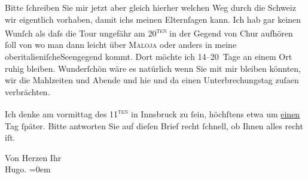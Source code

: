 \pstart
           Bitte{ }ſchreiben Sie mir jetzt {\pb}aber gleich hierher welchen Weg durch die Schweiz wir eigentlich vorhaben, damit ichs meinen Elternſagen kann. Ich hab gar keinen Wunſch als daſs die
               Tour ungefähr am 20\textsuperscript{\textsc{ten}} in der Gegend von Chur aufhören{ }ſoll von
               wo man dann leicht über \textsc{Maloja} oder anders {\pb}in meine oberitalieniſcheSeengegend kommt. Dort möchte ich 14–20 Tage an
               einem Ort ruhig bleiben. Wunderſchön wäre es natürlich wenn Sie mit mir bleiben
               könnten, wir die Mahlzeiten und Abende und hie und da einen Unterbrechungstag {\pb}zuſa{\geminationm}en verbrächten.\pend
           
\pstart
           Ich denke am vormittag des 11\textsuperscript{\textsc{ten}} in Innsbruck zu{ }ſein, höchſtens etwa um
                  \uline{einen} Tag{ }ſpäter. Bitte antworten Sie auf dieſen
               Brief recht{ }ſchnell, ob Ihnen alles recht iſt.\pend
           
\pstart
           Von Herzen Ihr{\\[\baselineskip]}\spacefill\mbox{Hugo.}\pend
           \leftskip=0em{}\endnumbering{}  \newcommand{\dateiname}{L00829}\newcommand{\titel}{Hugo von Hofmannsthal an Arthur Schnitzler, 3. 8. [1898]}\newcommand{\editorInnen}{Martin Anton Müller und Gerd-Hermann Susen}
